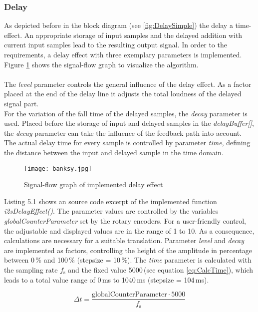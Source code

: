 \subsubsection{Delay}

As depicted before in the block diagram (see \ref{fig:DelaySimple}) the delay a time-effect. An appropriate storage of input samples and the delayed addition with current input samples lead to the resulting output signal. In order to the requirements, a delay effect with three exemplary parameters is implemented.
Figure \ref{fig:ImplementedDelayBlock} shows the signal-flow graph to visualize the algorithm.
\\
\\
The \textit{level} parameter controls the general influence of the delay effect. As a factor placed at the end of the delay line it adjusts the total loudness of the delayed signal part.\\
For the variation of the fall time of the delayed samples, the \textit{decay} parameter is used.
Placed before the storage of input and delayed samples in the \textit{delayBuffer[]}, the \textit{decay} parameter can take the influence of the feedback path into account.
The actual delay time for every sample is controlled by parameter \textit{time}, defining the distance between the input and delayed sample in the time domain.

\begin{figure}[H]
	\centering \texttt{[image: banksy.jpg]}
	\caption[ImplementedDelayBlock]{Signal-flow graph of implemented delay effect}
	\label{fig:ImplementedDelayBlock}
\end{figure}

Listing 5.1 shows an source code excerpt of the implemented function \textit{i2sDelayEffect()}.
The parameter values are controlled by the variables \textit{globalCounterParameter} set by the rotary encoders.
For a user-friendly control, the adjustable and displayed values are in the range of 1 to 10.
As a consequence, calculations are necessary for a suitable translation.
Parameter \textit{level} and \textit{decay} are implemented as factors, controlling the height of the amplitude in percentage between 0\,\% and 100\,\% (stepsize = 10\,\%).
The \textit{time} parameter is calculated with the sampling rate $f_\mathrm{s}$ and the fixed value 5000\,(see equation \ref{eq:CalcTime}), which leads to a total value range of 0\,ms to 1040\,ms (stepsize = 104\,ms).

\begin{equation}
\Delta t = \frac{\mathrm{globalCounterParameter} \cdot 5000}{f_\mathrm{s}} 
\label{eq:CalcTime}
\end{equation}



